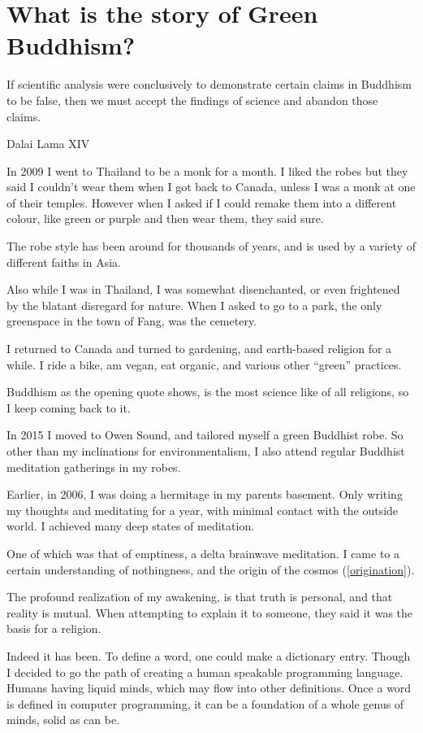 
\chapter{What is the story of Green Buddhism?}
\epigraph{If scientific analysis were conclusively to demonstrate certain claims
in Buddhism to be false, then we must accept the findings of science and abandon
those claims.}
{Dalai Lama XIV\cite{singleAtom}}
\label{whatstory}
In 2009 I went to Thailand to be a monk for a month. I liked the robes but they
said I couldn't wear them when I got back to Canada, unless I was a monk at one
of their temples. However when I asked if I could remake them into a different 
colour, like green or purple and then wear them, they said sure. 

The robe style has been around for thousands of years, and is used by a variety
of different faiths in Asia. 

Also while I was in Thailand, I was somewhat disenchanted, or even frightened by
the blatant disregard for nature. When I asked to go to a park, the only
greenspace in the town of Fang, was the cemetery. 

I returned to Canada and turned to gardening, and earth-based religion for a
while. I ride a bike, am vegan, eat organic, and various other ``green''
practices.

Buddhism as the opening quote shows, is the most science like of all religions,
so I keep coming back to it. 

In 2015 I moved to Owen Sound, and tailored myself a green Buddhist robe. So
other than my inclinations for environmentalism, I also attend regular Buddhist
meditation gatherings in my robes.

Earlier, in 2006, I was doing a hermitage in my parents basement. Only writing
my thoughts and meditating for a year, with minimal contact with the outside
world. I achieved many deep states of meditation.  

One of which was that of emptiness, a delta brainwave meditation. 
I came to a certain understanding of nothingness, and the origin of the
cosmos (\ref{origination}).

The profound realization of my awakening, is that truth is personal, and that
reality is mutual. When attempting to explain it to someone, they said it was
the basis for a religion. 

Indeed it has been. To define a word, one could make a dictionary entry. Though
I decided to go the path of creating a human speakable programming language.
Humans having liquid minds, which  may flow into other definitions. Once a word
is defined in computer programming, it can be a foundation of a whole genus of
minds, solid as can be.  

